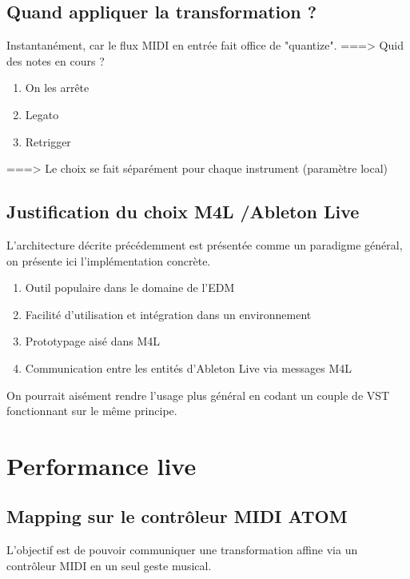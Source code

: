 \documentclass[french,11pt]{article}
\begin{document}
\subsection{Quand appliquer la transformation ? }
Instantanément, car le flux MIDI en entrée fait office de "quantize".  ===> Quid des notes en cours ?
\begin{enumerate}
  \item On les arrête
  \item Legato
  \item Retrigger
\end{enumerate}
===> Le choix se fait séparément pour chaque instrument (paramètre local)


\subsection{Justification du choix M4L /Ableton Live}
L'architecture décrite précédemment est présentée comme un paradigme général, on présente ici l'implémentation concrète.
\begin{enumerate}
  \item Outil populaire dans le domaine de l'EDM
  \item Facilité d'utilisation et intégration dans un environnement 
  \item Prototypage aisé dans M4L
  \item Communication entre les entités d'Ableton Live via messages M4L
\end{enumerate}
On pourrait aisément rendre l'usage plus général en codant un couple de VST fonctionnant sur le même principe.

\section{Performance live }
\subsection{Mapping sur le contrôleur MIDI ATOM}
L'objectif est de pouvoir communiquer une transformation affine via un contrôleur MIDI en un seul geste musical.
\end{document}
